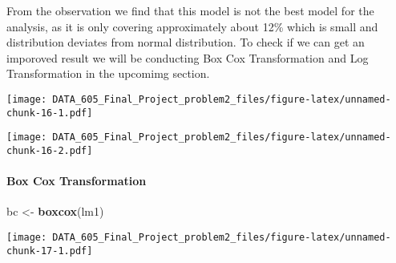 \documentclass[]{article}
\newenvironment{Shaded}{\begin{snugshade}}{\end{snugshade}}
\newcommand{\DataTypeTok}[1]{\textcolor[rgb]{0.13,0.29,0.53}{#1}}
\newcommand{\DecValTok}[1]{\textcolor[rgb]{0.00,0.00,0.81}{#1}}
\newcommand{\KeywordTok}[1]{\textcolor[rgb]{0.13,0.29,0.53}{\textbf{#1}}}
\newcommand{\NormalTok}[1]{#1}
\newcommand{\OperatorTok}[1]{\textcolor[rgb]{0.81,0.36,0.00}{\textbf{#1}}}
\newcommand{\StringTok}[1]{\textcolor[rgb]{0.31,0.60,0.02}{#1}}
\let\oldparagraph\paragraph
\renewcommand{\paragraph}[1]{\oldparagraph{#1}\mbox{}}
\begin{document}
From the observation we find that this model is not the best model for
the analysis, as it is only covering approximately about 12\% which is
small and distribution deviates from normal distribution. To check if we
can get an imporoved result we will be conducting Box Cox Transformation
and Log Transformation in the upcomimg section.

\begin{Shaded}
\end{Shaded}

\texttt{[image: DATA\_605\_Final\_Project\_problem2\_files/figure-latex/unnamed-chunk-16-1.pdf]}

\begin{Shaded}
\end{Shaded}

\texttt{[image: DATA\_605\_Final\_Project\_problem2\_files/figure-latex/unnamed-chunk-16-2.pdf]}

\hypertarget{box-cox-transformation}{%
\paragraph{Box Cox Transformation}\label{box-cox-transformation}}

\begin{Shaded}
\begin{Highlighting}[]
\NormalTok{bc <-}\StringTok{ }\KeywordTok{boxcox}\NormalTok{(lm1)}
\end{Highlighting}
\end{Shaded}

\texttt{[image: DATA\_605\_Final\_Project\_problem2\_files/figure-latex/unnamed-chunk-17-1.pdf]}

\begin{Shaded}
\end{Shaded}
\end{document}
